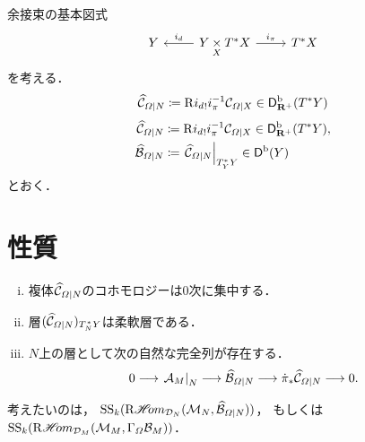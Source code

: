 余接束の基本図式
\[\begin{tikzcd}%
    Y
    &
    Y\dpb[X]\cotb[X]
      \arrow[r, "{\mpb[i]}"]
      \arrow[l, "{\mdiff[i]}"']
    &
    \cotb[X]
\end{tikzcd}\]
を考える．
\[
    \mildmfun[\varOmega\mid N]\coloneqq \Rder[]{\mdiff[i]}_{!}\mpb[i]^{-1}\mfun[\varOmega\mid X]\in \Dbconic(\cotb[Y])
\]
\begin{align*}
    \mildmfun[\varOmega\mid N]&\coloneqq \Rder[]{\mdiff[i]}_{!}\mpb[i]^{-1}\mfun[\varOmega\mid X]\in \Dbconic(\cotb[Y]),\\
    \mildhfun[\varOmega\mid N]&\coloneqq \mres[{\mildmfun[\varOmega\mid N]}]{{\cotz[Y]}}\in \Dompb(Y)
\end{align*}
とおく．

\section{性質}
\begin{PRP}
    \begin{enumerate}[(i)]
        \item 複体\(\mildmfun[\varOmega\mid N]\)のコホモロジーは\(0\)次に集中する．
        \item 層\((\mildmfun[\varOmega\mid N])_{\conm[N]{Y}}\)は柔軟層である．
        \item \(N\)上の層として次の自然な完全列が存在する．
        \[
            0\longrightarrow 
            \mres[\mathcal{A}_{M}]{N}\longrightarrow 
            \mildhfun[\varOmega\mid N]\longrightarrow 
            \dot{\pi}_{\ast}\mildmfun[\varOmega\mid N]
            \longrightarrow0.
        \]
    \end{enumerate}
\end{PRP}
考えたいのは，
\(\muS[k](\RHOM_{\mathcal{D}_{N}}(\mathcal{M}_{N},\mildhfun[\varOmega\mid N]))\)，
もしくは
\(\muS[k](\RHOM_{\mathcal{D}_{M}}(\mathcal{M}_{M},\Gamma_{\varOmega}\hfun[M]))\)．

